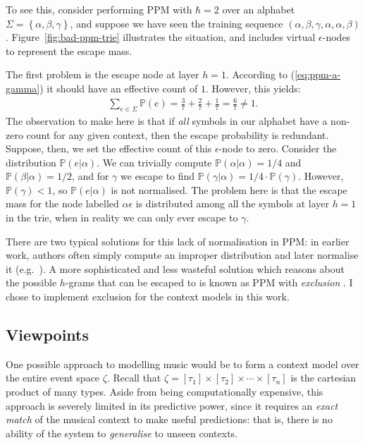 \documentclass[12pt,a4paper,twoside,openright]{report}
\newcommand{\set}[1]{ \left\{ #1 \right\} }
\begin{document}
To see this, consider performing PPM with $\hbar = 2$ over an alphabet $\Sigma =
\set{\alpha,\beta,\gamma}$, and suppose we have seen the training sequence
$(\alpha,\beta,\gamma,\alpha,\alpha,\beta)$.  Figure~\ref{fig:bad-ppm-trie}
illustrates the situation, and includes virtual $\epsilon$-nodes to represent
the escape mass.

The first problem is the escape node at layer $h = 1$. According to
(\ref{eq:ppm-a-gamma}) it should have an effective count of $1$. However, this
yields:
\begin{align}
  \sum_{e \in \Sigma} \mathbb{P}(e) = \frac{3}{7} + \frac{2}{7} + \frac{1}{7} =
\frac{6}{7} \neq 1. 
\end{align} 
The observation to make here is that if \emph{all} symbols in our alphabet have
a non-zero count for any given context, then the escape probability is
redundant. Suppose, then, we set the effective count of this $\epsilon$-node to
zero. Consider the distribution $\mathbb{P}(e|\alpha)$. We can trivially compute
$\mathbb{P}(\alpha|\alpha) = 1/4$ and $\mathbb{P}(\beta|\alpha) = 1/2$, and for
$\gamma$ we escape to find $\mathbb{P}(\gamma|\alpha) = 1/4 \cdot
\mathbb{P}(\gamma)$. However, $\mathbb{P}(\gamma) < 1$, so
$\mathbb{P}(e|\alpha)$ is not normalised. The problem here is that the escape
mass for the node labelled $\alpha\epsilon$ is distributed among all the symbols
at layer $h = 1$ in the trie, when in reality we can only ever escape to
$\gamma$.

There are two typical solutions for this lack of normalisation in PPM: in
earlier work, authors often simply compute an improper distribution and later
normalise it (e.g.\ \cite{conklin1990prediction}). A more sophisticated and less
wasteful solution which reasons about the possible $h$-grams that can be escaped
to is known as PPM with \emph{exclusion} \cite{pearce2004improved}. I chose to
implement exclusion for the context models in this work.

\subsection{Viewpoints}\label{sec:mvs-formalism}

One possible approach to modelling music would be to form a context model over
the entire event space $\zeta$.  Recall that $\zeta = [\tau_1] \times [\tau_2]
\times \cdots \times [\tau_n]$ is the cartesian product of many types. Aside
from being computationally expensive, this approach is severely limited in its
predictive power, since it requires an \emph{exact match} of the musical
context to make useful predictions: that is, there is no ability of the system
to \emph{generalise} to unseen contexts.
\end{document}

